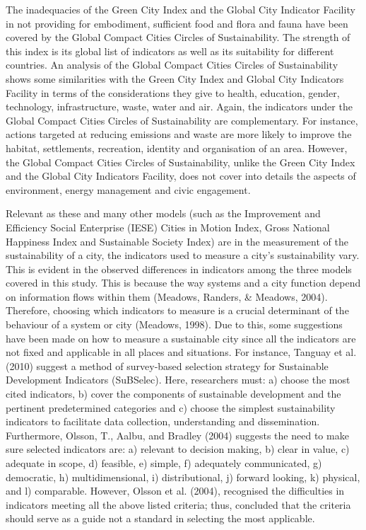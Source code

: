 The inadequacies of the Green City Index and the Global City Indicator Facility in not providing for embodiment, sufficient food and flora and fauna have been covered by the Global Compact Cities Circles of Sustainability. The strength of this index is its global list of indicators as well as its suitability for different countries. An analysis of the Global Compact Cities Circles of Sustainability shows some similarities with the Green City Index and Global City Indicators Facility in terms of the considerations they give to health, education, gender, technology, infrastructure, waste, water and air. Again, the indicators under the Global Compact Cities Circles of Sustainability are complementary. For instance, actions targeted at reducing emissions and waste are more likely to improve the habitat, settlements, recreation, identity and organisation of an area. However, the Global Compact Cities Circles of Sustainability, unlike the Green City Index and the Global City Indicators Facility, does not cover into details the aspects of environment, energy management and civic engagement.

Relevant as these and many other models (such as the Improvement and Efficiency Social Enterprise (IESE) Cities in Motion Index, Gross National Happiness Index and Sustainable Society Index) are in the measurement of the sustainability of a city, the indicators used to measure a city's sustainability vary. This is evident in the observed differences in indicators among the three models covered in this study. This is because the way systems and a city function depend on information flows within them (Meadows, Randers, \& Meadows, 2004). Therefore, choosing which indicators to measure is a crucial determinant of the behaviour of a system or city (Meadows, 1998). Due to this, some suggestions have been made on how to measure a sustainable city since all the indicators are not fixed and applicable in all places and situations. For instance, Tanguay et al. (2010) suggest a method of survey-based selection strategy for Sustainable Development Indicators (SuBSelec). Here, researchers must: a) choose the most cited indicators, b) cover the components of sustainable development and the pertinent predetermined categories and c) choose the simplest sustainability indicators to facilitate data collection, understanding and dissemination. Furthermore, Olsson, T., Aalbu, and Bradley (2004) suggests the need to make sure selected indicators are: a) relevant to decision making, b) clear in value, c) adequate in scope, d) feasible, e) simple, f) adequately communicated, g) democratic, h) multidimensional, i) distributional, j) forward looking, k) physical, and l) comparable. However, Olsson et al. (2004), recognised the difficulties in indicators meeting all the above listed criteria; thus, concluded that the criteria should serve as a guide not a standard in selecting the most applicable.

